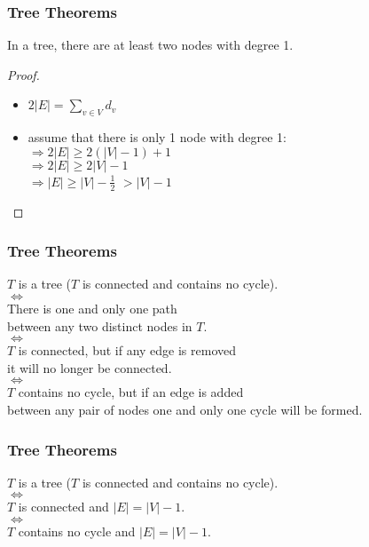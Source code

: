 \documentclass[dvipsnames]{beamer}
\begin{document}
\begin{frame}
  \frametitle{Tree Theorems}

  \begin{theorem}
    In a tree, there are at least two nodes with degree 1.
  \end{theorem}

  \pause
  \begin{proof}
    \begin{itemize}
      \item $2 |E| = \sum_{v \in V} d_v$

      \pause
      \item assume that there is only 1 node with degree 1:\\
        \pause
        $\Rightarrow 2 |E| \geq 2 (|V| - 1) + 1$\\
        \pause
        $\Rightarrow 2 |E| \geq 2 |V| - 1$\\
        \pause
        $\Rightarrow |E| \geq |V| - \frac{1}{2}$
        \pause
        $> |V| - 1$
    \end{itemize}
  \end{proof}
\end{frame}

\begin{frame}
  \frametitle{Tree Theorems}

  \begin{theorem}
    \begin{center}
      $T$ is a tree ($T$ is connected and contains no cycle).\\
      $\Leftrightarrow$\\
      There is one and only one path\\
        between any two distinct nodes in $T$.\\
      $\Leftrightarrow$\\
      $T$ is connected, but if any edge is removed\\
        it will no longer be connected.\\
      $\Leftrightarrow$\\
      $T$ contains no cycle, but if an edge is added\\
        between any pair of nodes one and only one cycle will be formed.
    \end{center}
  \end{theorem}
\end{frame}

\begin{frame}
  \frametitle{Tree Theorems}

  \begin{theorem}
    \begin{center}
      $T$ is a tree ($T$ is connected and contains no cycle).\\
      $\Leftrightarrow$\\
      $T$ is connected and $|E| = |V| - 1$.\\
      $\Leftrightarrow$\\
      $T$ contains no cycle and $|E| = |V| - 1$.
    \end{center}
  \end{theorem}
\end{frame}
\end{document}
